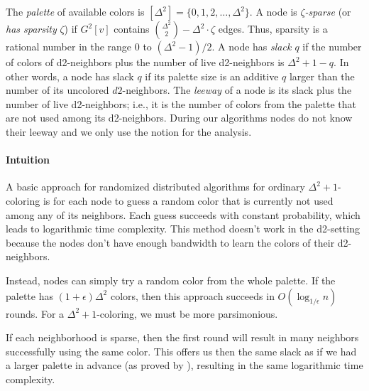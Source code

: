 
The \emph{palette} of available colors is $[\Delta^2] = \{0,1,2,\ldots, \Delta^2\}$. 
%
A node is \emph{$\zeta$-sparse} (or \emph{has sparsity} $\zeta$) if $G^2[v]$ contains $\binom{\Delta^2}{2} - \Delta^2\cdot \zeta$ edges.
Thus, sparsity is a rational number in the range $0$ to $(\Delta^2-1)/2$.
A node has \emph{slack $q$} if the number of colors of d2-neighbors plus the number of live d2-neighbors is $\Delta^2+1-q$. In other words, a node has slack $q$ if its palette size is an additive $q$ larger than the number of its uncolored $d2$-neighbors. 
The \emph{leeway} of a node is its slack plus the number of live d2-neighbors; i.e., it is the number of colors from the palette that are not used among its d2-neighbors.
During our algorithms nodes do not know their leeway and we only use the notion for the analysis.

\paragraph*{Intuition}
A basic approach for randomized distributed algorithms for ordinary $\Delta^2+1$-coloring is for each node to guess a random color that is currently not used among any of its neighbors. Each guess succeeds with constant probability, which leads to logarithmic time complexity. This method doesn't work in the d2-setting because the nodes don't have enough bandwidth to learn the colors of their d2-neighbors.

Instead, nodes can simply try a random color from the whole palette. If the palette has $(1+\epsilon)\Delta^2$ colors, then this approach succeeds in $O(\log_{1/\epsilon} n)$ rounds. For a $\Delta^2+1$-coloring, we must be more parsimonious. 

If each neighborhood is sparse, then the first round will result in many neighbors successfully using the same color. 
This offers us then the same slack as if we had a larger palette in advance (as proved by \cite{EPS15}), resulting in the same logarithmic time complexity.

